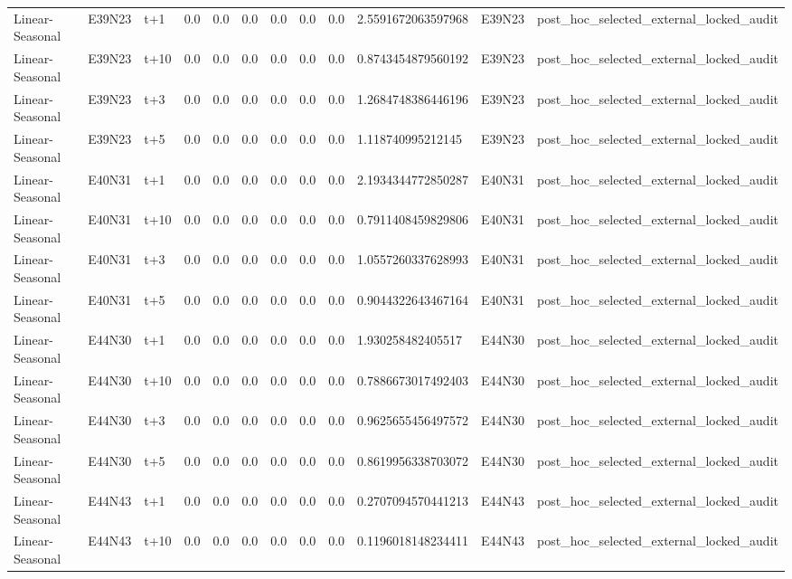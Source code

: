 \begin{landscape}
\begin{longtable}{llllllllllll}
Linear-Seasonal & E39N23 & t+1 & 0.0 & 0.0 & 0.0 & 0.0 & 0.0 & 0.0 & 2.5591672063597968 & E39N23 & post\_hoc\_selected\_external\_locked\_audit \\
Linear-Seasonal & E39N23 & t+10 & 0.0 & 0.0 & 0.0 & 0.0 & 0.0 & 0.0 & 0.8743454879560192 & E39N23 & post\_hoc\_selected\_external\_locked\_audit \\
Linear-Seasonal & E39N23 & t+3 & 0.0 & 0.0 & 0.0 & 0.0 & 0.0 & 0.0 & 1.2684748386446196 & E39N23 & post\_hoc\_selected\_external\_locked\_audit \\
Linear-Seasonal & E39N23 & t+5 & 0.0 & 0.0 & 0.0 & 0.0 & 0.0 & 0.0 & 1.118740995212145 & E39N23 & post\_hoc\_selected\_external\_locked\_audit \\
Linear-Seasonal & E40N31 & t+1 & 0.0 & 0.0 & 0.0 & 0.0 & 0.0 & 0.0 & 2.1934344772850287 & E40N31 & post\_hoc\_selected\_external\_locked\_audit \\
Linear-Seasonal & E40N31 & t+10 & 0.0 & 0.0 & 0.0 & 0.0 & 0.0 & 0.0 & 0.7911408459829806 & E40N31 & post\_hoc\_selected\_external\_locked\_audit \\
Linear-Seasonal & E40N31 & t+3 & 0.0 & 0.0 & 0.0 & 0.0 & 0.0 & 0.0 & 1.0557260337628993 & E40N31 & post\_hoc\_selected\_external\_locked\_audit \\
Linear-Seasonal & E40N31 & t+5 & 0.0 & 0.0 & 0.0 & 0.0 & 0.0 & 0.0 & 0.9044322643467164 & E40N31 & post\_hoc\_selected\_external\_locked\_audit \\
Linear-Seasonal & E44N30 & t+1 & 0.0 & 0.0 & 0.0 & 0.0 & 0.0 & 0.0 & 1.930258482405517 & E44N30 & post\_hoc\_selected\_external\_locked\_audit \\
Linear-Seasonal & E44N30 & t+10 & 0.0 & 0.0 & 0.0 & 0.0 & 0.0 & 0.0 & 0.7886673017492403 & E44N30 & post\_hoc\_selected\_external\_locked\_audit \\
Linear-Seasonal & E44N30 & t+3 & 0.0 & 0.0 & 0.0 & 0.0 & 0.0 & 0.0 & 0.9625655456497572 & E44N30 & post\_hoc\_selected\_external\_locked\_audit \\
Linear-Seasonal & E44N30 & t+5 & 0.0 & 0.0 & 0.0 & 0.0 & 0.0 & 0.0 & 0.8619956338703072 & E44N30 & post\_hoc\_selected\_external\_locked\_audit \\
Linear-Seasonal & E44N43 & t+1 & 0.0 & 0.0 & 0.0 & 0.0 & 0.0 & 0.0 & 0.2707094570441213 & E44N43 & post\_hoc\_selected\_external\_locked\_audit \\
Linear-Seasonal & E44N43 & t+10 & 0.0 & 0.0 & 0.0 & 0.0 & 0.0 & 0.0 & 0.1196018148234411 & E44N43 & post\_hoc\_selected\_external\_locked\_audit \\

\end{longtable}
\end{landscape}
